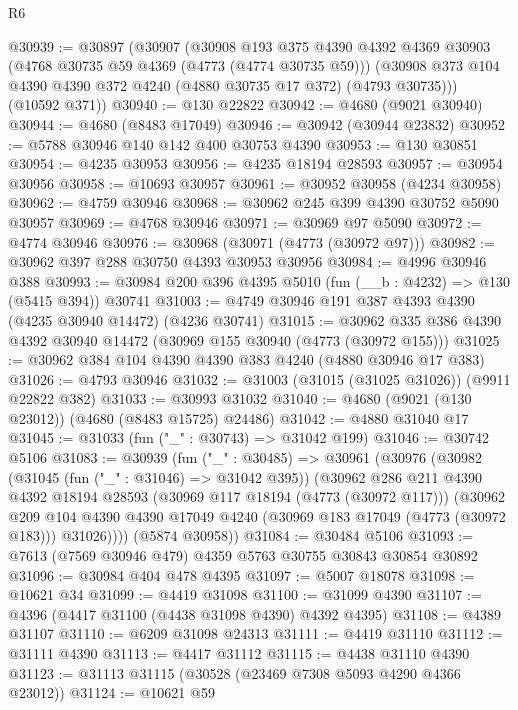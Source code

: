 \begin{lexlean}{R6}
\begin{coremodule}
@30939 := @30897
    (@30907
      (@30908
        @193
        @375
        @4390
        @4392
        @4369
        @30903
        (@4768 @30735 @59 @4369 (@4773 (@4774 @30735 @59)))
        (@30908 @373 @104 @4390 @4390 @372 @4240 (@4880 @30735 @17 @372) (@4793 @30735)))
      (@10592 @371))
@30940 := @130 @22822
@30942 := @4680 (@9021 @30940)
@30944 := @4680 (@8483 @17049)
@30946 := @30942 (@30944 @23832)
@30952 := @5788 @30946 @140 @142 @400 @30753 @4390
@30953 := @130 @30851
@30954 := @4235 @30953
@30956 := @4235 @18194 @28593
@30957 := @30954 @30956
@30958 := @10693 @30957
@30961 := @30952 @30958 (@4234 @30958)
@30962 := @4759 @30946
@30968 := @30962 @245 @399 @4390 @30752 @5090 @30957
@30969 := @4768 @30946
@30971 := @30969 @97 @5090
@30972 := @4774 @30946
@30976 := @30968 (@30971 (@4773 (@30972 @97)))
@30982 := @30962 @397 @288 @30750 @4393 @30953 @30956
@30984 := @4996 @30946 @388
@30993 := @30984 @200 @396 @4395 @5010 (fun (__b : @4232) => @130 (@5415 @394)) @30741
@31003 := @4749 @30946 @191 @387 @4393 @4390 (@4235 @30940 @14472) (@4236 @30741)
@31015 := @30962 @335 @386 @4390 @4392 @30940 @14472 (@30969 @155 @30940 (@4773 (@30972 @155)))
@31025 := @30962 @384 @104 @4390 @4390 @383 @4240 (@4880 @30946 @17 @383)
@31026 := @4793 @30946
@31032 := @31003 (@31015 (@31025 @31026)) (@9911 @22822 @382)
@31033 := @30993 @31032
@31040 := @4680 (@9021 (@130 @23012)) (@4680 (@8483 @15725) @24486)
@31042 := @4880 @31040 @17
@31045 := @31033 (fun ("_" : @30743) => @31042 @199)
@31046 := @30742 @5106
@31083 := @30939
    (fun ("_" : @30485) =>
    @30961
      (@30976
        (@30982
          (@31045 (fun ("_" : @31046) => @31042 @395))
          (@30962
            @286
            @211
            @4390
            @4392
            @18194
            @28593
            (@30969 @117 @18194 (@4773 (@30972 @117)))
            (@30962
              @209
              @104
              @4390
              @4390
              @17049
              @4240
              (@30969 @183 @17049 (@4773 (@30972 @183)))
              @31026))))
      (@5874 @30958))
@31084 := @30484 @5106
@31093 := @7613 (@7569 @30946 @479) @4359 @5763 @30755 @30843 @30854 @30892
@31096 := @30984 @404 @478 @4395
@31097 := @5007 @18078
@31098 := @10621 @34
@31099 := @4419 @31098
@31100 := @31099 @4390
@31107 := @4396 (@4417 @31100 (@4438 @31098 @4390) @4392 @4395)
@31108 := @4389 @31107
@31110 := @6209 @31098 @24313
@31111 := @4419 @31110
@31112 := @31111 @4390
@31113 := @4417 @31112
@31115 := @4438 @31110 @4390
@31123 := @31113 @31115 (@30528 (@23469 @7308 @5093 @4290 @4366 @23012))
@31124 := @10621 @59

\end{coremodule}
\end{lexlean}
